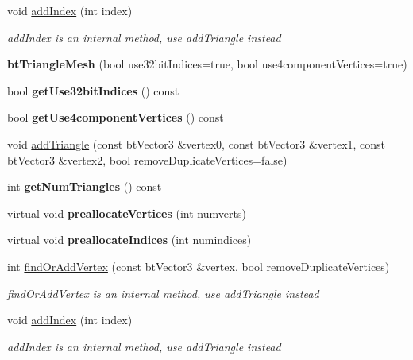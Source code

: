 \begin{DoxyCompactItemize}
void \hyperlink{classbtTriangleMesh_aceefc2d4c6a9abaff3bd58310533fd8a}{add\+Index} (int index)
\begin{DoxyCompactList}\small\item\em add\+Index is an internal method, use add\+Triangle instead \end{DoxyCompactList}\item 
\mbox{\label{classbtTriangleMesh_a686eefc0978d30da88bdc43c6d75589f}} 
{\bfseries bt\+Triangle\+Mesh} (bool use32bit\+Indices=true, bool use4component\+Vertices=true)
\item 
\mbox{\label{classbtTriangleMesh_af13198c9c8f5cb3f542a30ea4d5790fa}} 
bool {\bfseries get\+Use32bit\+Indices} () const
\item 
\mbox{\label{classbtTriangleMesh_abac757c144236dcc133cb27dd9d9f5bf}} 
bool {\bfseries get\+Use4component\+Vertices} () const
\item 
void \hyperlink{classbtTriangleMesh_a28551d57ae59248a210163a504558583}{add\+Triangle} (const bt\+Vector3 \&vertex0, const bt\+Vector3 \&vertex1, const bt\+Vector3 \&vertex2, bool remove\+Duplicate\+Vertices=false)
\item 
\mbox{\label{classbtTriangleMesh_a2e6b51f9d56b3b5f1aca4f4ee11f6c1c}} 
int {\bfseries get\+Num\+Triangles} () const
\item 
\mbox{\label{classbtTriangleMesh_af5855ddef1da229a63ee3f31285cc4c3}} 
virtual void {\bfseries preallocate\+Vertices} (int numverts)
\item 
\mbox{\label{classbtTriangleMesh_aaa362f7c92721f3d16cbe406b3628797}} 
virtual void {\bfseries preallocate\+Indices} (int numindices)
\item 
\mbox{\label{classbtTriangleMesh_a3b521a1faa5862a818d9f983230749a2}} 
int \hyperlink{classbtTriangleMesh_a3b521a1faa5862a818d9f983230749a2}{find\+Or\+Add\+Vertex} (const bt\+Vector3 \&vertex, bool remove\+Duplicate\+Vertices)
\begin{DoxyCompactList}\small\item\em find\+Or\+Add\+Vertex is an internal method, use add\+Triangle instead \end{DoxyCompactList}\item 
\mbox{\label{classbtTriangleMesh_aceefc2d4c6a9abaff3bd58310533fd8a}} 
void \hyperlink{classbtTriangleMesh_aceefc2d4c6a9abaff3bd58310533fd8a}{add\+Index} (int index)
\begin{DoxyCompactList}\small\item\em add\+Index is an internal method, use add\+Triangle instead \end{DoxyCompactList}\end{DoxyCompactItemize}
